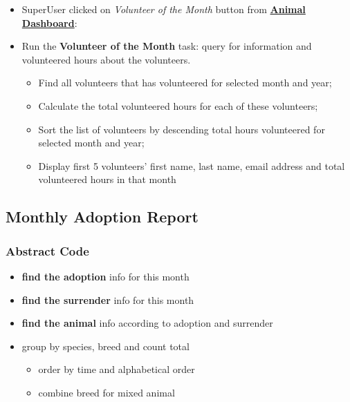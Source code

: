 \documentclass[a4paper]{article}
\begin{document}
\begin{itemize}
	\item SuperUser clicked on \textit{Volunteer of the Month} button from \underline{\textbf{Animal Dashboard}}:
	\item Run the \textbf{Volunteer of the Month} task: query for information and volunteered hours about the volunteers.
	\begin{itemize}
		\item Find all volunteers that has volunteered for selected month and year;
		\item Calculate the total volunteered hours for each of these volunteers;
		\item Sort the list of volunteers by descending total hours volunteered for selected month and year;
		\item Display first 5 volunteers' first name, last name, email address and total volunteered hours in that month
	\end{itemize}

\end{itemize}




\hypertarget{monthly_adoption_report}{\subsection{Monthly Adoption Report}}

\subsubsection*{Abstract Code}

\begin{itemize}
	\item \textbf{find the adoption} info for this month
	\item \textbf{find the surrender} info for this month
    \item \textbf{find the animal} info according to adoption and surrender
\item group by species, breed and count total
    \begin{itemize}
        \item  order by time and alphabetical order
        \item combine breed for mixed animal

    \end{itemize}




\end{itemize}
\end{document}
